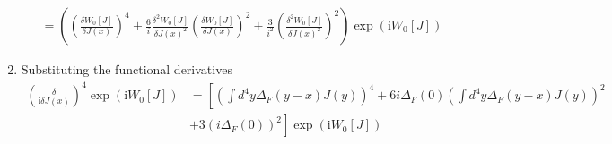 \documentclass[10pt,a4paper]{article}
\theoremstyle{definition}
\begin{document}
\begin{enumerate}
\begin{align*}
    &=\left(\left(\frac{\delta W_0[J]}{\delta J(x)}\right)^4+\frac{6}{i}\frac{\delta^2 W_0[J]}{\delta J(x)^2}\left(\frac{\delta W_0[J]}{\delta J(x)}\right)^2+\frac{3}{i^2}\left(\frac{\delta^2 W_0[J]}{\delta J(x)^2}\right)^2\right)\exp\left(\text{i}W_0[J]\right)
\end{align*}
\item Substituting the functional derivatives
\begin{align*}    
     \left(\frac{\delta}{\text{i}\delta J(x)}\right)^4\exp\left(\text{i}W_0[J]\right)&=\left[\left(\int d^4y\Delta_F(y-x)J(y)\right)^4+6i\Delta_F(0)\left(\int d^4y\Delta_F(y-x)J(y)\right)^2\right.\\
     &\left.+3\left(i\Delta_F(0)\right)^2\right]\exp\left(\text{i}W_0[J]\right)\\
\end{align*}
\end{enumerate}
\end{document}
